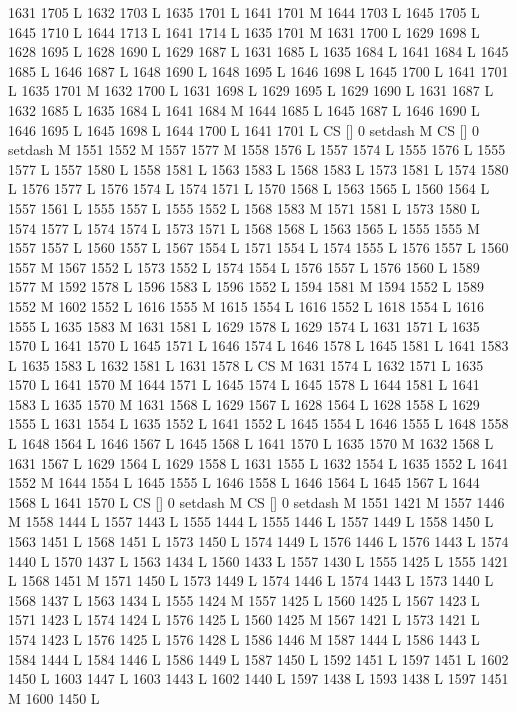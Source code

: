 {{{{{{{{{{{{{{{{{{{{{{{{1631 1705 L
1632 1703 L
1635 1701 L
1641 1701 M 1644 1703 L
1645 1705 L
1645 1710 L
1644 1713 L
1641 1714 L
1635 1701 M 1631 1700 L
1629 1698 L
1628 1695 L
1628 1690 L
1629 1687 L
1631 1685 L
1635 1684 L
1641 1684 L
1645 1685 L
1646 1687 L
1648 1690 L
1648 1695 L
1646 1698 L
1645 1700 L
1641 1701 L
1635 1701 M 1632 1700 L
1631 1698 L
1629 1695 L
1629 1690 L
1631 1687 L
1632 1685 L
1635 1684 L
1641 1684 M 1644 1685 L
1645 1687 L
1646 1690 L
1646 1695 L
1645 1698 L
1644 1700 L
1641 1701 L
CS [] 0 setdash M
CS [] 0 setdash M
1551 1552 M 1557 1577 M 1558 1576 L
1557 1574 L
1555 1576 L
1555 1577 L
1557 1580 L
1558 1581 L
1563 1583 L
1568 1583 L
1573 1581 L
1574 1580 L
1576 1577 L
1576 1574 L
1574 1571 L
1570 1568 L
1563 1565 L
1560 1564 L
1557 1561 L
1555 1557 L
1555 1552 L
1568 1583 M 1571 1581 L
1573 1580 L
1574 1577 L
1574 1574 L
1573 1571 L
1568 1568 L
1563 1565 L
1555 1555 M 1557 1557 L
1560 1557 L
1567 1554 L
1571 1554 L
1574 1555 L
1576 1557 L
1560 1557 M 1567 1552 L
1573 1552 L
1574 1554 L
1576 1557 L
1576 1560 L
1589 1577 M 1592 1578 L
1596 1583 L
1596 1552 L
1594 1581 M 1594 1552 L
1589 1552 M 1602 1552 L
1616 1555 M 1615 1554 L
1616 1552 L
1618 1554 L
1616 1555 L
1635 1583 M 1631 1581 L
1629 1578 L
1629 1574 L
1631 1571 L
1635 1570 L
1641 1570 L
1645 1571 L
1646 1574 L
1646 1578 L
1645 1581 L
1641 1583 L
1635 1583 L
1632 1581 L
1631 1578 L
CS M
1631 1574 L
1632 1571 L
1635 1570 L
1641 1570 M 1644 1571 L
1645 1574 L
1645 1578 L
1644 1581 L
1641 1583 L
1635 1570 M 1631 1568 L
1629 1567 L
1628 1564 L
1628 1558 L
1629 1555 L
1631 1554 L
1635 1552 L
1641 1552 L
1645 1554 L
1646 1555 L
1648 1558 L
1648 1564 L
1646 1567 L
1645 1568 L
1641 1570 L
1635 1570 M 1632 1568 L
1631 1567 L
1629 1564 L
1629 1558 L
1631 1555 L
1632 1554 L
1635 1552 L
1641 1552 M 1644 1554 L
1645 1555 L
1646 1558 L
1646 1564 L
1645 1567 L
1644 1568 L
1641 1570 L
CS [] 0 setdash M
CS [] 0 setdash M
1551 1421 M 1557 1446 M 1558 1444 L
1557 1443 L
1555 1444 L
1555 1446 L
1557 1449 L
1558 1450 L
1563 1451 L
1568 1451 L
1573 1450 L
1574 1449 L
1576 1446 L
1576 1443 L
1574 1440 L
1570 1437 L
1563 1434 L
1560 1433 L
1557 1430 L
1555 1425 L
1555 1421 L
1568 1451 M 1571 1450 L
1573 1449 L
1574 1446 L
1574 1443 L
1573 1440 L
1568 1437 L
1563 1434 L
1555 1424 M 1557 1425 L
1560 1425 L
1567 1423 L
1571 1423 L
1574 1424 L
1576 1425 L
1560 1425 M 1567 1421 L
1573 1421 L
1574 1423 L
1576 1425 L
1576 1428 L
1586 1446 M 1587 1444 L
1586 1443 L
1584 1444 L
1584 1446 L
1586 1449 L
1587 1450 L
1592 1451 L
1597 1451 L
1602 1450 L
1603 1447 L
1603 1443 L
1602 1440 L
1597 1438 L
1593 1438 L
1597 1451 M 1600 1450 L
}}}}}}}}}}}}}}}}}}}}}}}}

